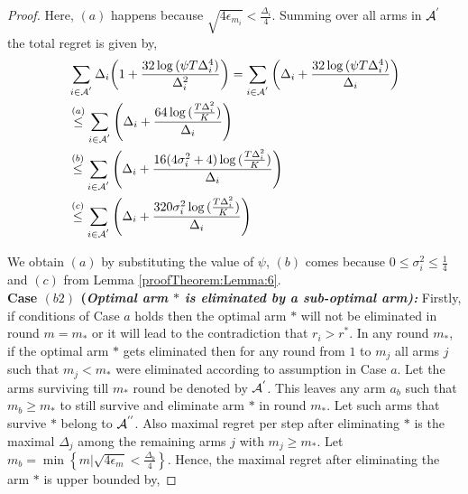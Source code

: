 \begin{proof}
Here, $(a)$ happens because $\sqrt{4\epsilon_{m_{i}}} < \frac{\Delta_{i}}{4}$. Summing over all arms in $\mathcal{A}^{'}$ the total regret is given by, 
\begin{align*}
&\sum_{i\in \A^{'}}\Delta_{i}\bigg(1+\dfrac{32\log{(\psi T\Delta_{i}^{4}})}{\Delta_{i}^{2}}\bigg) = \sum_{i\in \A^{'}}\bigg(\Delta_{i} +\dfrac{32\log{(\psi T\Delta_{i}^{4}})}{\Delta_{i}}\bigg) \\
&\overset{(a)}{\leq} \sum_{i\in \A^{'}} \left(\Delta_{i}+\dfrac{64\log{( \frac{T\Delta_{i}^{2}}{K})}}{\Delta_{i}}\right)\\
&\overset{(b)}{\leq} \sum_{i\in \A^{'}} \left(\Delta_{i} +\dfrac{16(4\sigma_i^2 + 4)\log{( \frac{T\Delta_{i}^{2}}{K})}}{\Delta_{i}}\right)\\
&%
\overset{(c)}{\leq} \sum_{i\in \A^{'}} \left(\Delta_{i} +\dfrac{320\sigma_i^2\log{( \frac{T\Delta_{i}^{2}}{K})}}{\Delta_{i}}\right)\\
\end{align*}

We obtain $(a)$ by substituting the value of $\psi$, $(b)$ comes because $0\leq\sigma_i^2 \leq\frac{1}{4}$ and $(c)$ from Lemma \ref{proofTheorem:Lemma:6}.\\

\noindent
\textbf{Case $(b2)$ (\textit{Optimal arm ${*}$ is eliminated by a sub-optimal arm):  }} Firstly, if conditions of Case $a$ holds then the optimal arm ${*}$ will not be eliminated in round $m=m_{*}$ or it will lead to the contradiction that $r_{i}>r^{*}$. In any round $m_{*}$, if the optimal arm ${*}$ gets eliminated then for any round from $1$ to $m_{j}$ all arms ${j}$ such that $m_{j}< m_{*}$ were eliminated according to assumption in Case $a$. Let the arms surviving till $m_{*}$ round be denoted by $\mathcal{A}^{'}$. This leaves any arm $a_{b}$ such that $m_{b}\geq m_{*}$ to still survive and eliminate arm ${*}$ in round $m_{*}$. Let such arms that survive ${*}$ belong to $\mathcal{A}^{''}$. Also maximal regret per step after eliminating ${*}$ is the maximal $\Delta_{j}$ among the remaining arms ${j}$ with $m_{j}\geq m_{*}$.  Let $m_{b}=\min\left\lbrace m|\sqrt{4\epsilon_{m}}<\frac{\Delta_{b}}{4}\right\rbrace$. Hence, the maximal regret after eliminating the arm ${*}$ is upper bounded by, 


\end{proof}

